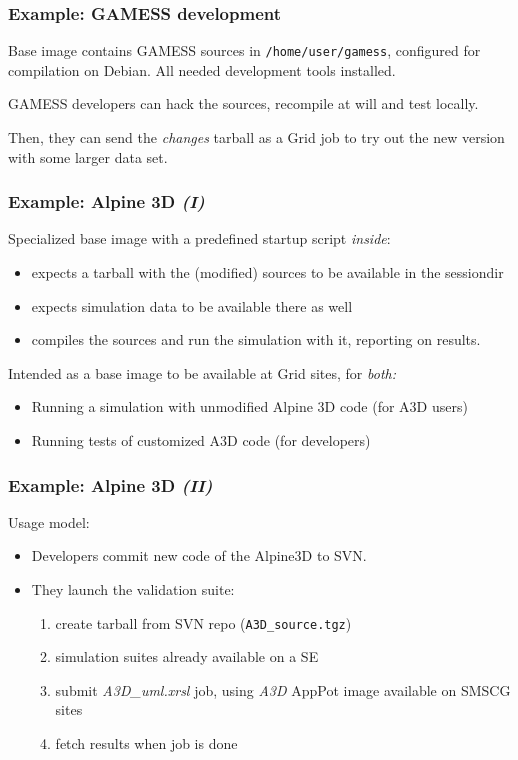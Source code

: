 \documentclass{beamer}
\begin{document}
\begin{frame}
  \frametitle{Example: GAMESS development}
  \label{sec:19}

  Base image contains GAMESS sources in \texttt{/home/user/gamess},
  configured for compilation on Debian.  All needed development tools
  installed. 
  
  GAMESS developers can hack the sources, recompile at will and test
  locally.
  
  Then, they can send the \emph{changes} tarball as a Grid job to try out the
  new version with some larger data set.
\end{frame}


\begin{frame}
  \frametitle{Example: Alpine 3D \emph{(I)}}
  \label{sec:17}
  
  Specialized base image with a predefined startup script \emph{inside}:
  \begin{itemize}
  \item expects a tarball with the (modified) sources to be available in
    the sessiondir
  \item expects simulation data to be available there as well
  \item compiles the sources and run the simulation with it, reporting on
    results.
  \end{itemize}
  
  Intended as a base image to be available at Grid sites, for \emph{both:}
  \begin{itemize}
  \item Running a simulation with unmodified Alpine 3D code (for A3D users)
  \item Running tests of customized A3D code (for developers)
  \end{itemize}
\end{frame}


\begin{frame}
  \frametitle{Example: Alpine 3D \emph{(II)}}
  Usage model:
  \begin{itemize}
  \item Developers commit new code of the Alpine3D to SVN.
  \item They launch the validation suite:
    \begin{enumerate}
    \item create tarball from SVN repo (\texttt{A3D{\_}source.tgz})
    \item simulation suites already available on a SE
    \item submit \emph{A3D{\_}uml.xrsl} job, using \emph{A3D} AppPot
      image available on SMSCG sites
    \item fetch results when job is done
    \end{enumerate}
  \end{itemize}
\end{frame}  
\end{document}
